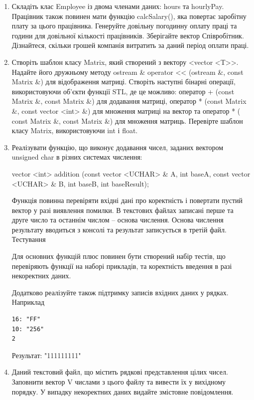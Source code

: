 \documentclass[a5paper,titlepage,openany,twoside,
]
{book_unv}%
\begin{document}
\begin{enumerate}
\item
  Складіть клас Employee із двома членами даних: hours та hourlyPay.
  Працівник також повинен мати функцію calcSalary(), яка повертає
  заробітну плату за цього працівника. Генеруйте довільну погодинну
  оплату праці та години для довільної кількості працівників. Зберігайте
  вектор Співробітник. Дізнайтеся, скільки
  грошей компанія витратить за даний період оплати праці.


\item
  Створіть шаблон класу Matrix, який створений з вектору
  \textless{}vector \textless{}T\textgreater{}\textgreater{}. Надайте
  його дружньому методу ostream \& operator \textless{}\textless{}
  (ostream \&, const Matrix \&) для відображення матриці. Створіть
  наступні бінарні операції, використовуючи об'єкти функції STL, де це
  можливо: оператор + (const Matrix \&, const Matrix \&) для додавання
  матриці, оператор * (const Matrix \&, const vector
  \textless{}int\textgreater{} \&) для множення матриці на вектор та
  оператор * ( const Matrix \&, const Matrix \&) для множення матриць.
  Перевірте шаблон класу Matrix, використовуючи int і float.

\item
Реалізувати функцію, що виконує додавання чисел, заданих вектором unsigned char
в різних системах числення:

vector <int> addition (const vector <UCHAR> \& A, int baseA,
                      const vector <UCHAR> \& B, int baseB, int baseResult);

Функція повинна перевіряти вхідні дані про коректність і повертати пустий вектор у разі виявлення помилки.
В текстових файлах записані перше та друге число та останнім числом -- основа числення.
Основа числення результату вводиться з консолі та результат записується в третій файл.
Тестування

Для основних функцій плюс повинен бути створений набір тестів, що перевіряють функції на наборі прикладів,
та коректність введення в разі некоректних даних.

Додатково реалізуйте також підтримку записів вхідних даних у рядках. Наприклад
\begin{verbatim}
16: "FF"
10: "256"
2
\end{verbatim}
Результат:
"111111111"

\item
Даний текстовий файл, що містить рядкові
представлення цілих чисел. Заповнити вектор V числами з цього файлу
та вивести їх у вихідному порядку. У випадку некоректних даних видайте
змістовне повідомлення.


\end{enumerate}
\end{document}
